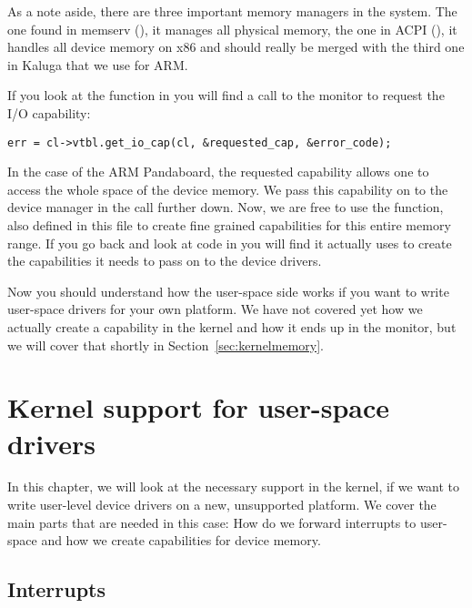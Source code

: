 \documentclass[a4paper,11pt,twoside]{report}
\begin{document}
As a note aside, there are three important memory managers in the system. The
one found in memserv (), it manages all physical memory,
the one in ACPI (), it handles all device memory on x86 and
should really be merged with the third one in Kaluga that we use for ARM.

If you look at the function  in 
you will find a call to the monitor to request the I/O capability:

\begin{lstlisting}[caption={RPC call to receive the I/O capability from
the monitor.}, label={lst:getio}]
err = cl->vtbl.get_io_cap(cl, &requested_cap, &error_code);
\end{lstlisting}

In the case of the ARM Pandaboard, the requested capability allows one to
access the whole space of the device memory. We pass this capability on to the
device manager in the  call further down. Now, we are free to
use the  function, also defined in this file to
create fine grained capabilities for this entire memory range. If you go back
and look at code in  you will find it
actually uses  to create the capabilities it needs to
pass on to the device drivers.

Now you should understand how the user-space side works if you want to write
user-space drivers for your own platform. We have not covered yet how we
actually create a capability in the kernel and how it ends up in the monitor,
but we will cover that shortly in Section~\ref{sec:kernelmemory}.

\chapter{Kernel support for user-space drivers}
\label{chap:kernel}

In this chapter, we will look at the necessary support in the kernel, if we
want to write user-level device drivers on a new, unsupported platform. We
cover the main parts that are needed in this case: How do we forward
interrupts to user-space and how we create capabilities for device memory.

\section{Interrupts}
\label{sec:kernelirq}
\end{document}
